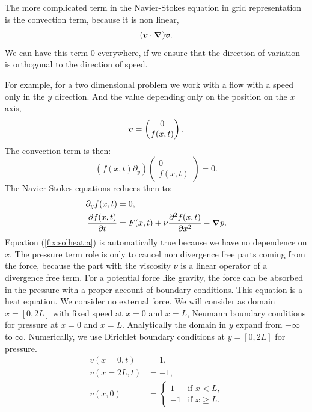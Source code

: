 The more complicated term in the Navier-Stokes equation in grid representation is the convection term, because it is non linear,
\begin{equation}
	({\boldsymbol {v}}\cdot {\boldsymbol {\nabla}}){\boldsymbol {v}}.
\end{equation}
We can have this term $0$ everywhere, if we ensure that the direction of variation is orthogonal to the direction of speed.

For example, for a two dimensional problem we work with a flow with a speed only in the $y$ direction. And the value depending only on the position on the $x$ axis,
\begin{equation}
	{\boldsymbol {v}}=\begin{pmatrix}
	         	0\\f(x,t)
	         \end{pmatrix}.
\end{equation}
The convection term is then:
\begin{equation}
	(f(x,t)\partial_{y})\begin{pmatrix}
	         	0\\f(x,t)
	         \end{pmatrix}=0.
\end{equation}
The Navier-Stokes equations reduces then to:
\begin{align}
\label{fix:solheat:a}
	\partial_{y}f(x,t)&=0,\\
	\frac{\partial f(x,t)}{\partial t}&=F(x,t)+\nu\frac{\partial^2 f(x,t)}{\partial x^2}-{\boldsymbol {\nabla}}p.
\end{align}
Equation (\ref{fix:solheat:a}) is automatically true because we have no dependence on $x$.
The pressure term role is only to cancel non divergence free parts coming from the force, because the part with the viscosity $\nu$ is a linear operator
of a divergence free term.
For a potential force like gravity, the force can be absorbed in the pressure with a proper account of boundary conditions.
This equation is a heat equation.
We consider no external force.
We will consider as domain $x=[0,2L]$ with fixed speed at $x=0$ and $x=L$,  Neumann boundary conditions for pressure at $x=0$ and $x=L$.
Analytically the domain in $y$ expand from $-\infty$ to $\infty$. Numerically, we use Dirichlet boundary conditions at $y=[0,2L]$ for pressure.
\begin{align*}
    v(x=0,t)&=1,\\
    v(x=2L,t)&=-1,\\
    v(x,0)&=\begin{cases}
             1&\text{if $x<L$,}\\
             -1& \text{if $x\geq L$.}
            \end{cases}
\end{align*}

